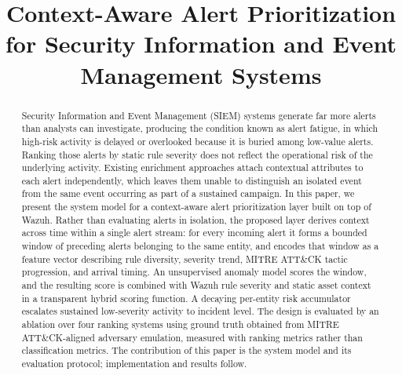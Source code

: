 \documentclass[conference]{IEEEtran}
\begin{document}
\title{Context-Aware Alert Prioritization for Security Information and Event Management Systems}
\author{%
}

\maketitle

\begin{abstract}
Security Information and Event Management (SIEM) systems generate far more alerts than analysts can investigate, producing the condition known as alert fatigue, in which high-risk activity is delayed or overlooked because it is buried among low-value alerts. Ranking those alerts by static rule severity does not reflect the operational risk of the underlying activity. Existing enrichment approaches attach contextual attributes to each alert independently, which leaves them unable to distinguish an isolated event from the same event occurring as part of a sustained campaign. In this paper, we present the system model for a context-aware alert prioritization layer built on top of Wazuh. Rather than evaluating alerts in isolation, the proposed layer derives context across time within a single alert stream: for every incoming alert it forms a bounded window of preceding alerts belonging to the same entity, and encodes that window as a feature vector describing rule diversity, severity trend, MITRE ATT\&CK tactic progression, and arrival timing. An unsupervised anomaly model scores the window, and the resulting score is combined with Wazuh rule severity and static asset context in a transparent hybrid scoring function. A decaying per-entity risk accumulator escalates sustained low-severity activity to incident level. The design is evaluated by an ablation over four ranking systems using ground truth obtained from MITRE ATT\&CK-aligned adversary emulation, measured with ranking metrics rather than classification metrics. The contribution of this paper is the system model and its evaluation protocol; implementation and results follow.
\end{abstract}
\end{document}
